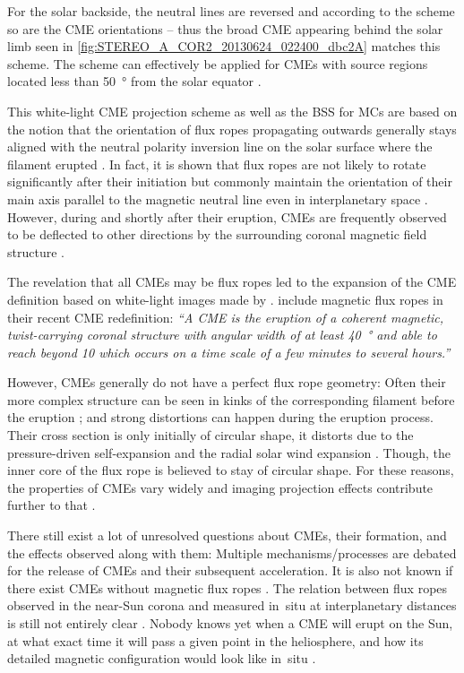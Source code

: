 For the solar backside, the neutral lines are reversed and according to the scheme so are the CME orientations -- thus the broad CME appearing behind the solar limb seen in \autoref{fig:STEREO_A_COR2_20130624_022400_dbc2A} matches this scheme. The scheme can effectively be applied for CMEs with source regions located less than \SI{50}{\degree} from the solar equator \citep{Webb2012}.

This white-light CME projection scheme as well as the BSS for MCs are based on the notion that the orientation of flux ropes propagating outwards generally stays aligned with the neutral polarity inversion line on the solar surface where the filament erupted \citep{Marubashi1997,Bothmer1998}. In fact, it is shown that flux ropes are not likely to rotate significantly after their initiation but commonly maintain the orientation of their main axis parallel to the magnetic neutral line even in interplanetary space \citep{Marubashi2015}. However, during and shortly after their eruption, CMEs are frequently observed to be deflected to other directions by the surrounding coronal magnetic field structure \citep{Sterling2011}.

The revelation that all CMEs may be flux ropes \citep{Vourlidas2013,Marubashi2015} led to the expansion of the CME definition based on white-light images made by \citet{Hundhausen1984}. \citet{Vourlidas2013,Vourlidas2014} include magnetic flux ropes in their recent CME redefinition: \textit{``A CME is the eruption of a coherent magnetic, twist-carrying coronal structure with angular width of at least \SI{40}{\degree} and able to reach beyond \SI{10}{\Rs} which occurs on a time scale of a few minutes to several hours.''}

However, CMEs generally do not have a perfect flux rope geometry: Often their more complex structure can be seen in kinks of the corresponding filament before the eruption \citep{Bothmer2017}; and strong distortions can happen during the eruption process. Their cross section is only initially of circular shape, it distorts due to the pressure-driven self-expansion and the radial solar wind expansion \citep{Owens2006}. Though, the inner core of the flux rope is believed to stay of circular shape. For these reasons, the properties of CMEs vary widely and imaging projection effects contribute further to that \citep{Cremades2004}.

There still exist a lot of unresolved questions about CMEs, their formation, and the effects observed along with them: Multiple mechanisms/processes are debated for the release of CMEs and their subsequent acceleration. It is also not known if there exist CMEs without magnetic flux ropes \citep{Vourlidas2013}. The relation between flux ropes observed in the near-Sun corona and measured in~situ at interplanetary distances is still not entirely clear \citep{Vourlidas2014}. Nobody knows yet when a CME will erupt on the Sun, at what exact time it will pass a given point in the heliosphere, and how its detailed magnetic configuration would look like in~situ \citep{Gopalswamy2016}.

